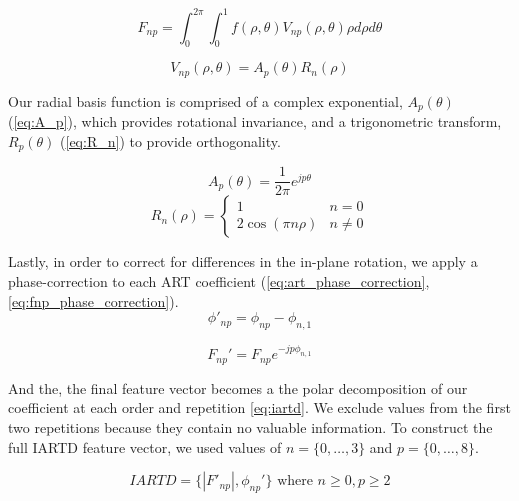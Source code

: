 \begin{equation}
	\label{eq:F_np}
	F_{np} = \int_{0}^{2\pi}\int_{0}^{1}f(\rho,\theta)V_{np}(\rho,\theta)\rho d\rho d\theta
\end{equation}

\begin{equation}
	\label{eq:V_np}
	V_{np}(\rho,\theta) = A_{p}(\theta)R_{n}(\rho)
\end{equation}

Our radial basis function is comprised of a complex exponential, $A_{p}(\theta)$ (\cref{eq:A_p}), which provides rotational invariance, and a trigonometric transform, $R_{p}(\theta)$ (\cref{eq:R_n}) to provide orthogonality.

\begin{equation}
	\label{eq:A_p}
	A_{p}(\theta) = \dfrac{1}{2\pi}e^{jp\theta}
\end{equation}
\begin{equation}
	\label{eq:R_n}
	R_{n}(\rho) =
	\begin{cases}
		1                   & n=0     \\
		2 \cos (\pi n \rho) & n \ne 0
	\end{cases}
\end{equation}

Lastly, in order to correct for differences in the in-plane rotation, we apply a phase-correction to each ART coefficient (\cref{eq:art_phase_correction}, \cref{eq:fnp_phase_correction}).
\begin{equation}
	\label{eq:art_phase_correction}
	\phi'_{np} = \phi_{np} - \phi_{n,1}
\end{equation}

\begin{equation}
	\label{eq:fnp_phase_correction}
	F_{np}' = F_{np}e^{-jp\phi_{n,1}}
\end{equation}

And the, the final feature vector becomes a the polar decomposition of our coefficient at each order and repetition \cref{eq:iartd}.
We exclude values from the first two repetitions because they contain no valuable information.
To construct the full IARTD feature vector, we used values of $n=\{0, \dots, 3 \}$ and $p=\{0, \dots, 8\}$.

\begin{equation}
	\label{eq:iartd}
	IARTD = \{|F'_{np}|, \phi_{np}'\} \text{ where } n \ge 0, p \ge 2
\end{equation}

